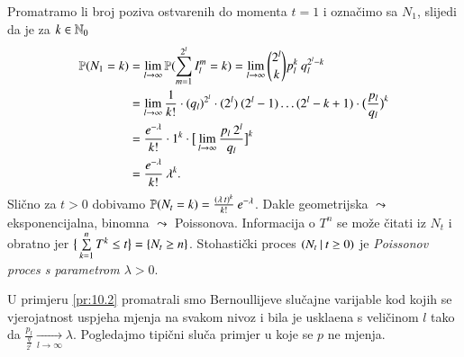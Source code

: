\begin{pr}
    Promatramo li broj poziva ostvarenih do momenta $t = 1$ i ozna\v cimo sa $N_1$, slijedi da je za $k \in \mathbb{N}_0$
    \begin{equation*}
        \begin{aligned}
            \mathbb{P}({N_1 = k}) &= \lim\limits_{l \to \infty} \mathbb{P}({\sum\limits_{m = 1}^{2^l} I_l^m = k }) = \lim\limits_{l \to \infty} {2^l \choose k} p_l^k \: q_l^{2^l - k}\\
            &= \lim\limits_{l \to \infty} \frac{1}{k!} \cdot (q_l)^{2^l} \cdot (2^l) \: (2^l - 1) \ldots (2^l - k + 1) \cdot \big( \frac{p_l}{q_l} \big)^k\\
            &= \frac{e^{-\lambda}}{k!} \cdot 1^k \cdot \big[ \lim\limits_{l \to \infty} \frac{p_l \: 2^l}{q_l} \big]^k\\
            &= \frac{e^{-\lambda}}{k!} \: \lambda^k.
        \end{aligned}
    \end{equation*}
    Sli\v cno za $t > 0$ dobivamo $\mathbb{P}({N_t = k}) = \frac{(\lambda \: t)^k}{k!} \: e^{-\lambda}$.
    Dakle geometrijska $\leadsto$ eksponencijalna, binomna $\leadsto$ Poissonova.
    Informacija o $T^n$ se mo\v ze \v citati iz $N_t$ i obratno jer $\big\{ \sum\limits_{k = 1}^{n} T^k \leq t \big\} = \{ N_t \geq n \}$.
    Stohasti\v cki proces $({N_t} \: | \: {t \geq 0})$ je \emph{Poissonov proces s parametrom $\lambda > 0$}.
\end{pr}

U primjeru \ref{pr:10.2} promatrali smo Bernoullijeve slu\v cajne varijable kod kojih se vjerojatnost uspjeha mjenja na svakom nivoz i bila je uskla\dj ena s veli\v cinom $l$ tako da $\frac{p_l}{\frac{q}{2^l}} \xrightarrow[l \to \infty]{} \lambda$.
Pogledajmo tipi\v cni slu\v ca primjer u koje se $p$ ne mjenja.

